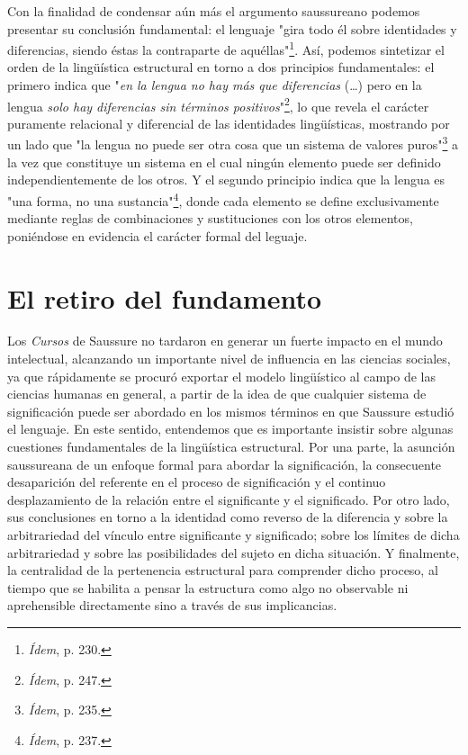 \documentclass{book}
\begin{document}
Con la finalidad de condensar aún más el argumento saussureano podemos
presentar su conclusión fundamental: el lenguaje "gira todo él sobre
identidades y diferencias, siendo éstas la contraparte de
aquéllas"\footnote{\emph{Ídem}, p. 230.}. Así, podemos sintetizar el
orden de la lingüística estructural en torno a dos principios
fundamentales: el primero indica que "\emph{en la lengua no hay más que
diferencias} (\dots) pero en la lengua \emph{solo hay diferencias
sin términos positivos}"\footnote{\emph{Ídem}, p. 247.}, lo que revela
el carácter puramente relacional y diferencial de las identidades
lingüísticas, mostrando por un lado que "la lengua no puede ser otra
cosa que un sistema de valores puros"\footnote{\emph{Ídem}, p. 235.} a
la vez que constituye un sistema en el cual ningún elemento puede ser
definido independientemente de los otros. Y el segundo principio indica
que la lengua es "una forma, no una sustancia"\footnote{\emph{Ídem}, p.
  237.}, donde cada elemento se define exclusivamente mediante reglas de
combinaciones y sustituciones con los otros elementos, poniéndose en
evidencia el carácter formal del leguaje.

\hypertarget{el-retiro-del-fundamento}{%
\section{El retiro del fundamento}\label{el-retiro-del-fundamento}}

Los \emph{Cursos} de Saussure no tardaron en generar un fuerte impacto
en el mundo intelectual, alcanzando un importante nivel de influencia en
las ciencias sociales, ya que rápidamente se procuró exportar el modelo
lingüístico al campo de las ciencias humanas en general, a partir de la
idea de que cualquier sistema de significación puede ser abordado en los
mismos términos en que Saussure estudió el lenguaje. En este sentido,
entendemos que es importante insistir sobre algunas cuestiones
fundamentales de la lingüística estructural. Por una parte, la asunción
saussureana de un enfoque formal para abordar la significación, la
consecuente desaparición del referente en el proceso de significación y
el continuo desplazamiento de la relación entre el significante y el
significado. Por otro lado, sus conclusiones en torno a la identidad
como reverso de la diferencia y sobre la arbitrariedad del vínculo entre
significante y significado; sobre los límites de dicha arbitrariedad y
sobre las posibilidades del sujeto en dicha situación. Y finalmente, la
centralidad de la pertenencia estructural para comprender dicho proceso,
al tiempo que se habilita a pensar la estructura como algo no observable
ni aprehensible directamente sino a través de sus implicancias.
\end{document}
